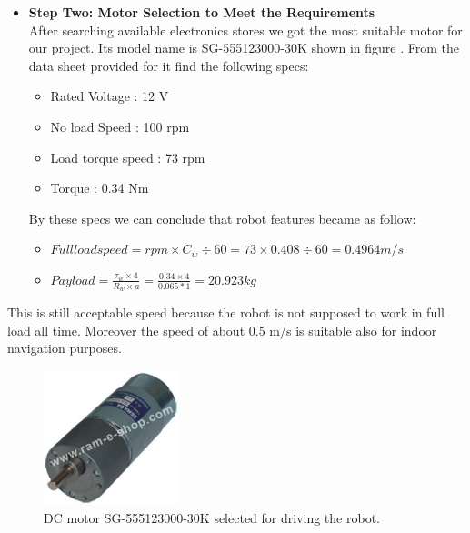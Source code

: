\documentclass[12pt]{book}
\begin{document}
\begin{itemize}
	\item \textbf{Step Two: Motor Selection to Meet the Requirements}\\
	After searching available electronics stores we got the most suitable motor for our project. Its model name is SG-555123000-30K shown in figure . From the data sheet provided for it find the following specs:\cite{204}
	\begin{itemize}
		\item Rated Voltage : 12 V
		\item No load Speed : 100 rpm
		\item Load torque speed : 73 rpm
		\item Torque : 0.34 Nm
	\end{itemize}
	By these specs we can conclude that robot features became as follow:
	\begin{itemize}
		\item ${Full  load  speed = rpm \times C_w \div 60 = 73 \times 0.408 \div 60 = 0.4964 m/s}$
		\item ${Pay load = \frac{ \tau_w \times 4}{ R_w \times a} = \frac{0.34 \times 4}{0.065 * 1} = 20.923 kg}$
		
	\end{itemize}
\end{itemize}

This is still acceptable speed because the robot is not supposed to work in full load all time. Moreover the speed of about 0.5 m/s is suitable also for indoor navigation purposes.

\begin{figure}
	\centering
	\includegraphics[width =0.35\textwidth]{Fig/dc-motor.jpg}
	\caption{DC motor SG-555123000-30K selected for driving the robot.}
	\label{fig:dc-motor}
\end{figure}
\end{document}
